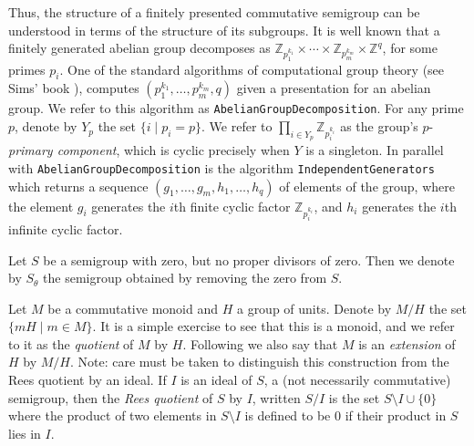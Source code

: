 \documentclass{acmconf}
\begin{document}
Thus, the structure of a finitely presented commutative semigroup
can be understood in terms of the structure of its subgroups. 
It is well known that a finitely generated abelian group decomposes
as $\mathbb{Z}_{p_1^{k_1}} \times \cdots \times \mathbb{Z}_{p_m^{k_m}} 
\times \mathbb{Z}^q$, for some primes $p_i$.
One of the standard algorithms of computational
group theory (see Sims' book \cite{sims}), computes
$(p_1^{k_1}, \ldots, p_m^{k_m}, q)$ given a presentation for an 
abelian group. We refer to this algorithm as {\tt AbelianGroupDecomposition}.
For any prime $p$, denote by $Y_p$ the set $\{ i \mid p_i = p\}$. 
We refer to $\prod_{i \in Y_p}\mathbb{Z}_{p_i^{k_i}}$ as the  group's 
$p$-{\em primary component}, which is cyclic precisely when $Y$ 
is a singleton.  In parallel with {\tt AbelianGroupDecomposition}
is the algorithm {\tt IndependentGenerators} which returns a sequence
$(g_1, \ldots, g_m, h_1, \ldots, h_q)$ of elements of the group,
where the element $g_i$ generates the $i$th finite 
cyclic factor $\mathbb{Z}_{p_i^{k_i}}$, and $h_i$ generates 
the $i$th infinite cyclic factor.

Let $S$ be a semigroup with zero, but no proper divisors of zero.
Then we denote by $S_\theta$ the semigroup obtained by removing the
zero from $S$.

Let $M$ be a commutative monoid and $H$ a group of units.
Denote by $M/H$ the set $\{mH \mid m \in M\}$. It is a simple exercise
to see that this is a monoid, and we refer to it as the 
{\em quotient} of $M$ by $H$. Following  \cite{pDJW91}
we also say that $M$ is an {\em extension} of $H$ by $M/H$.
Note: care must be taken to distinguish this construction from 
the Rees quotient by an ideal. If $I$ is an ideal of $S$, a (not necessarily
commutative) semigroup, then the \emph{Rees quotient} of $S$ by $I$, 
written $S/I$ is the set $S \setminus I \cup \{0\}$ where 
the product of two elements in  $S \setminus I$ 
is defined to be $0$ if their product in $S$ lies in $I$.



\end{document}
